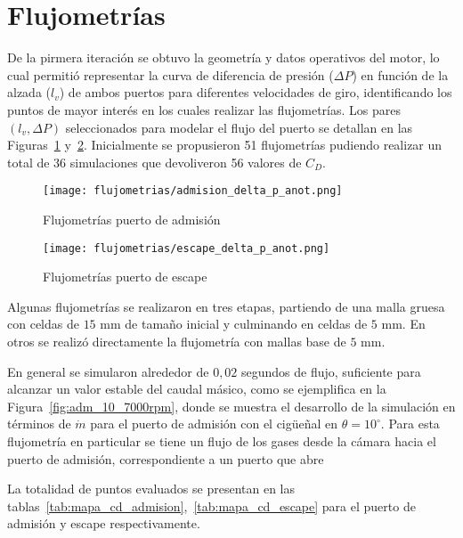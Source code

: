 \section{Flujometrías}

De la pirmera iteración se obtuvo la geometría y datos operativos del motor, lo
cual permitió representar la curva de diferencia de presión ($\Delta P$) en
función de la alzada ($l_{v}$) de ambos puertos para diferentes velocidades de
giro, identificando los puntos de mayor interés en los cuales realizar las
flujometrías.
%
Los pares $(l_{v}, \Delta P)$ seleccionados para modelar el flujo del puerto se
detallan en las Figuras~\ref{fig:delta_p_admision} y~\ref{fig:delta_p_escape}.
%
Inicialmente se propusieron 51 flujometrías pudiendo realizar un total de 36
simulaciones que devoliveron 56 valores de $C_{D}$.

\begin{figure}[h!]
  \centering
  \texttt{[image: flujometrias/admision\_delta\_p\_anot.png]}
  \caption{Flujometrías puerto de admisión}\label{fig:delta_p_admision}
\end{figure}

\begin{figure}[h!]
  \centering
  \texttt{[image: flujometrias/escape\_delta\_p\_anot.png]}
  \caption{Flujometrías puerto de escape}\label{fig:delta_p_escape}
\end{figure}


Algunas flujometrías se realizaron en tres etapas, partiendo de una malla gruesa
con celdas de $15$ mm de tamaño inicial y culminando en celdas de $5$ mm.
%
En otros se realizó directamente la flujometría con mallas base de $5$ mm.

En general se simularon alrededor de $0,02$ segundos de flujo, suficiente para
alcanzar un valor estable del caudal másico, como se ejemplifica en la
Figura~\ref{fig:adm_10_7000rpm}, donde se muestra el desarrollo de la simulación
en términos de $\dot{m}$ para el puerto de admisión con el cigüeñal en
$\theta=10^{\circ}$.
%
Para esta flujometría en particular se tiene un flujo de los gases desde la
cámara hacia el puerto de admisión, correspondiente a un puerto que abre

%
%
La totalidad de puntos evaluados se presentan en las
tablas~\ref{tab:mapa_cd_admision},~\ref{tab:mapa_cd_escape} para el puerto de
admisión y escape respectivamente.

